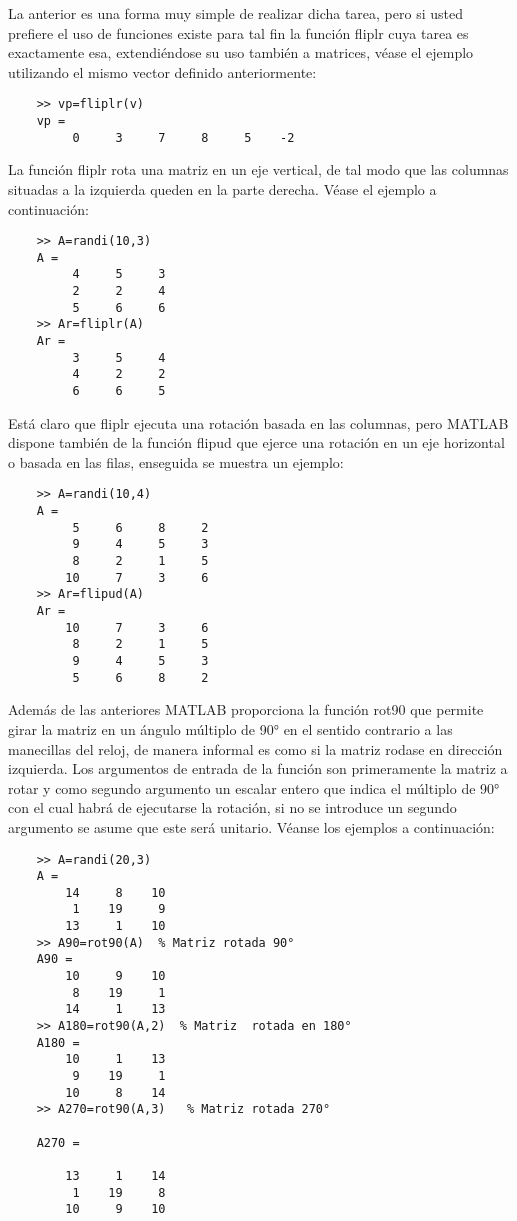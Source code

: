 La anterior es una forma muy simple de realizar dicha tarea, pero si usted prefiere 
el uso de funciones existe para tal fin la función fliplr cuya tarea es exactamente esa, 
extendiéndose su uso también a matrices, véase el ejemplo utilizando el mismo vector 
definido anteriormente:

\begin{verbatim}
	>> vp=fliplr(v)
	vp =
	     0     3     7     8     5    -2
\end{verbatim}

La función fliplr rota una matriz en un eje vertical, de tal modo que las columnas 
situadas a la izquierda queden en la parte derecha. Véase el ejemplo a continuación:

\begin{verbatim}
	>> A=randi(10,3)
	A =
	     4     5     3
	     2     2     4
	     5     6     6
	>> Ar=fliplr(A)
	Ar =
	     3     5     4
	     4     2     2
	     6     6     5
\end{verbatim}

Está claro que fliplr ejecuta una rotación basada en las columnas, pero MATLAB 
dispone también de la función flipud que ejerce una rotación en un eje horizontal 
o basada en las filas, enseguida se muestra un ejemplo:

\begin{verbatim}
	>> A=randi(10,4)
	A =
	     5     6     8     2
	     9     4     5     3
	     8     2     1     5
	    10     7     3     6
	>> Ar=flipud(A)
	Ar =
	    10     7     3     6
	     8     2     1     5
	     9     4     5     3
	     5     6     8     2
\end{verbatim}

Además de las anteriores MATLAB proporciona la función rot90 que permite girar la 
matriz en un ángulo múltiplo de 90° en el sentido contrario a las manecillas del 
reloj, de manera informal es como si la matriz rodase en dirección izquierda. Los 
argumentos de entrada de la función son primeramente la matriz a rotar y como segundo 
argumento un escalar entero que indica el múltiplo de 90° con el cual habrá de ejecutarse 
la rotación, si no se introduce un segundo argumento se asume que este será unitario. 
Véanse los ejemplos a continuación:

\begin{verbatim}
	>> A=randi(20,3)
	A =
	    14     8    10
	     1    19     9
	    13     1    10
	>> A90=rot90(A)  % Matriz rotada 90°
	A90 =
	    10     9    10
	     8    19     1
	    14     1    13
	>> A180=rot90(A,2)  % Matriz  rotada en 180°
	A180 =
	    10     1    13
	     9    19     1
	    10     8    14
	>> A270=rot90(A,3)   % Matriz rotada 270°

	A270 =

	    13     1    14
	     1    19     8
	    10     9    10
\end{verbatim}


